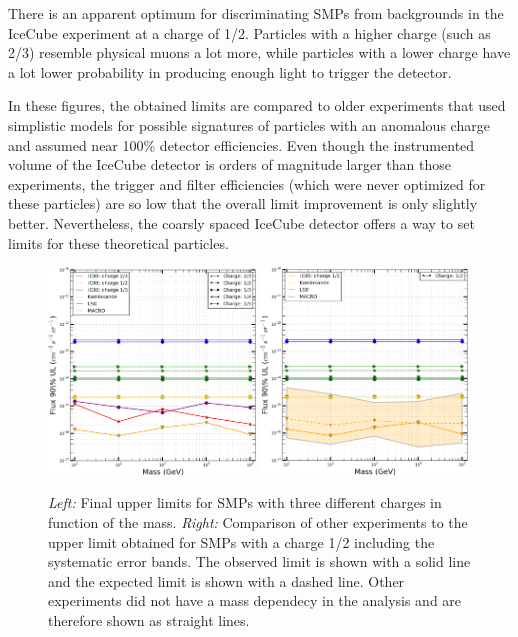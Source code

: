 There is an apparent optimum for discriminating SMPs from backgrounds in the IceCube experiment at a charge of 1/2. Particles with a higher charge (such as 2/3) resemble physical muons a lot more, while particles with a lower charge have a lot lower probability in producing enough light to trigger the detector.

In these figures, the obtained limits are compared to older experiments that used simplistic models for possible signatures of particles with an anomalous charge and assumed near 100\% detector efficiencies. Even though the instrumented volume of the IceCube detector is orders of magnitude larger than those experiments, the trigger and filter efficiencies (which were never optimized for these particles) are so low that the overall limit improvement is only slightly better. Nevertheless, the coarsly spaced IceCube detector offers a way to set limits for these theoretical particles.

\begin{figure}
\centering
\includegraphics[width=0.49\textwidth]{chapter8/img/UpperLimitPlot_massesOBSERVED.png}
\includegraphics[width=0.49\textwidth]{chapter8/img/UpperLimitPlot_masses_withunc_0p5}
\caption{\textit{Left: }Final upper limits for SMPs with three different charges in function of the mass. \textit{Right: }Comparison of other experiments to the upper limit obtained for SMPs with a charge 1/2 including the systematic error bands. The observed limit is shown with a solid line and the expected limit is shown with a dashed line. Other experiments did not have a mass dependecy in the analysis and are therefore shown as straight lines.}
\label{fig:moneyplot1}
\end{figure}

